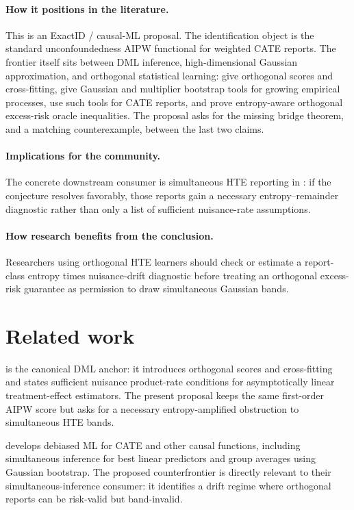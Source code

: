 \documentclass[11pt]{article}
\theoremstyle{definition}
\theoremstyle{plain}
\theoremstyle{remark}
\begin{document}
\paragraph{How it positions in the literature.}
This is an ExactID / causal-ML proposal.  The identification object is the
standard unconfoundedness AIPW functional for weighted CATE reports.  The
frontier itself sits between DML inference, high-dimensional Gaussian
approximation, and orthogonal statistical learning: \citet{ChernozhukovEtAl2018DML}
give orthogonal scores and cross-fitting, \citet{ChernozhukovChetverikovKato2017EmpiricalBootstrap}
give Gaussian and multiplier bootstrap tools for growing empirical processes,
\citet{SemenovaChernozhukov2021DMLCATE} use such tools for CATE reports, and
\citet{FosterSyrgkanis2023OSL} prove entropy-aware orthogonal excess-risk
oracle inequalities.  The proposal asks for the missing bridge theorem, and a
matching counterexample, between the last two claims.

\paragraph{Implications for the community.}
The concrete downstream consumer is simultaneous HTE reporting in
\citet{SemenovaChernozhukov2021DMLCATE}: if the conjecture resolves favorably,
those reports gain a necessary entropy--remainder diagnostic rather than only a
list of sufficient nuisance-rate assumptions.

\paragraph{How research benefits from the conclusion.}
Researchers using orthogonal HTE learners should check or estimate a
report-class entropy times nuisance-drift diagnostic before treating an
orthogonal excess-risk guarantee as permission to draw simultaneous Gaussian
bands.

\section{Related work}
\citet{ChernozhukovEtAl2018DML} is the canonical DML anchor: it introduces
orthogonal scores and cross-fitting and states sufficient nuisance product-rate
conditions for asymptotically linear treatment-effect estimators.  The present
proposal keeps the same first-order AIPW score but asks for a necessary
entropy-amplified obstruction to simultaneous HTE bands.

\citet{SemenovaChernozhukov2021DMLCATE} develops debiased ML for CATE and
other causal functions, including simultaneous inference for best linear
predictors and group averages using Gaussian bootstrap.  The proposed
counterfrontier is directly relevant to their simultaneous-inference consumer:
it identifies a drift regime where orthogonal reports can be risk-valid but
band-invalid.
\end{document}
